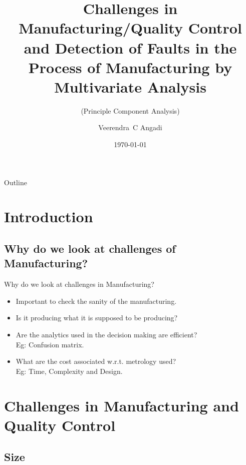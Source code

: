 \documentclass{beamer}
\title[Challenges in Mnfg/QC and Faults Detection using PCA]{Challenges in Manufacturing/Quality Control and Detection of Faults in the Process of Manufacturing by Multivariate Analysis}
\subtitle{(Principle Component Analysis)}
\author{Veerendra~C Angadi}
\institute[University of Sheffield] %
{
  Department of Electronic and Electrical Engineering,\\
  George Porter Building, Red Hill - Broad Lane,\\
  University of Sheffield - S3 7HQ
}
\date{\today}
\begin{document}
\begin{frame}
  \titlepage
\end{frame}

\begin{frame}{Outline}
  \tableofcontents
\end{frame}

\section{Introduction}

\subsection{Why do we look at challenges of Manufacturing?}


\begin{frame}{Why do we look at challenges in Manufacturing?}
  \begin{itemize}
    \item Important to check the sanity of the manufacturing.
    \item Is it producing what it is supposed to be producing?
    \item Are the analytics used in the decision making are efficient? \\ Eg: Confusion matrix.
    \item What are the cost associated w.r.t. metrology used? \\ Eg: Time, Complexity and Design.
  \end{itemize}
\end{frame}

\section{Challenges in Manufacturing and Quality Control}

\subsection{Size}
\end{document}

